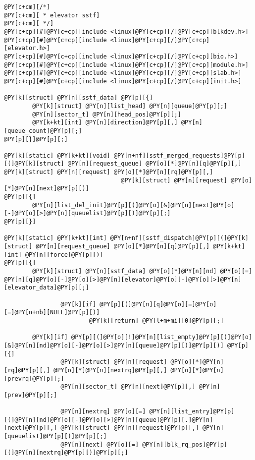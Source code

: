 \begin{Verbatim}[commandchars=@\[\]]
@PY[c+cm][/*]
@PY[c+cm][ * elevator sstf]
@PY[c+cm][ */]
@PY[c+cp][#]@PY[c+cp][include <linux]@PY[c+cp][/]@PY[c+cp][blkdev.h>]
@PY[c+cp][#]@PY[c+cp][include <linux]@PY[c+cp][/]@PY[c+cp][elevator.h>]
@PY[c+cp][#]@PY[c+cp][include <linux]@PY[c+cp][/]@PY[c+cp][bio.h>]
@PY[c+cp][#]@PY[c+cp][include <linux]@PY[c+cp][/]@PY[c+cp][module.h>]
@PY[c+cp][#]@PY[c+cp][include <linux]@PY[c+cp][/]@PY[c+cp][slab.h>]
@PY[c+cp][#]@PY[c+cp][include <linux]@PY[c+cp][/]@PY[c+cp][init.h>]

@PY[k][struct] @PY[n][sstf_data] @PY[p][{]
        @PY[k][struct] @PY[n][list_head] @PY[n][queue]@PY[p][;]
        @PY[n][sector_t] @PY[n][head_pos]@PY[p][;]
        @PY[k+kt][int] @PY[n][direction]@PY[p][,] @PY[n][queue_count]@PY[p][;]
@PY[p][}]@PY[p][;]

@PY[k][static] @PY[k+kt][void] @PY[n+nf][sstf_merged_requests]@PY[p][(]@PY[k][struct] @PY[n][request_queue] @PY[o][*]@PY[n][q]@PY[p][,] @PY[k][struct] @PY[n][request] @PY[o][*]@PY[n][rq]@PY[p][,]
                                 @PY[k][struct] @PY[n][request] @PY[o][*]@PY[n][next]@PY[p][)]
@PY[p][{]
        @PY[n][list_del_init]@PY[p][(]@PY[o][&]@PY[n][next]@PY[o][-]@PY[o][>]@PY[n][queuelist]@PY[p][)]@PY[p][;]
@PY[p][}]

@PY[k][static] @PY[k+kt][int] @PY[n+nf][sstf_dispatch]@PY[p][(]@PY[k][struct] @PY[n][request_queue] @PY[o][*]@PY[n][q]@PY[p][,] @PY[k+kt][int] @PY[n][force]@PY[p][)]
@PY[p][{]
        @PY[k][struct] @PY[n][sstf_data] @PY[o][*]@PY[n][nd] @PY[o][=] @PY[n][q]@PY[o][-]@PY[o][>]@PY[n][elevator]@PY[o][-]@PY[o][>]@PY[n][elevator_data]@PY[p][;]
                
                @PY[k][if] @PY[p][(]@PY[n][q]@PY[o][=]@PY[o][=]@PY[n+nb][NULL]@PY[p][)] 
                        @PY[k][return] @PY[l+m+mi][0]@PY[p][;]
                
        @PY[k][if] @PY[p][(]@PY[o][!]@PY[n][list_empty]@PY[p][(]@PY[o][&]@PY[n][nd]@PY[o][-]@PY[o][>]@PY[n][queue]@PY[p][)]@PY[p][)] @PY[p][{]
                @PY[k][struct] @PY[n][request] @PY[o][*]@PY[n][rq]@PY[p][,] @PY[o][*]@PY[n][nextrq]@PY[p][,] @PY[o][*]@PY[n][prevrq]@PY[p][;]
                @PY[n][sector_t] @PY[n][next]@PY[p][,] @PY[n][prev]@PY[p][;]
                                
                @PY[n][nextrq] @PY[o][=] @PY[n][list_entry]@PY[p][(]@PY[n][nd]@PY[o][-]@PY[o][>]@PY[n][queue]@PY[p][.]@PY[n][next]@PY[p][,] @PY[k][struct] @PY[n][request]@PY[p][,] @PY[n][queuelist]@PY[p][)]@PY[p][;]
                @PY[n][next] @PY[o][=] @PY[n][blk_rq_pos]@PY[p][(]@PY[n][nextrq]@PY[p][)]@PY[p][;]
                                

\end{Verbatim}
